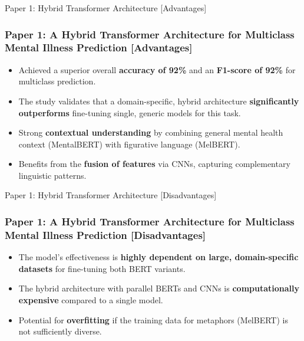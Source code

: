 \documentclass[11pt]{beamer}
\begin{document}
\begin{frame}{Paper 1: Hybrid Transformer Architecture [Advantages]}
\frametitle{Paper 1: A Hybrid Transformer Architecture for Multiclass Mental Illness Prediction [Advantages]}
\begin{itemize}
    \item Achieved a superior overall \textbf{accuracy of 92\%} and an \textbf{F1-score of 92\%} for multiclass prediction.
    \item The study validates that a domain-specific, hybrid architecture \textbf{significantly outperforms} fine-tuning single, generic models for this task.
    \item Strong \textbf{contextual understanding} by combining general mental health context (MentalBERT) with figurative language (MelBERT).
    \item Benefits from the \textbf{fusion of features} via CNNs, capturing complementary linguistic patterns.
\end{itemize}
\end{frame}

\begin{frame}{Paper 1: Hybrid Transformer Architecture [Disadvantages]}
\frametitle{Paper 1: A Hybrid Transformer Architecture for Multiclass Mental Illness Prediction [Disadvantages]}
\begin{itemize}
    \item The model's effectiveness is \textbf{highly dependent on large, domain-specific datasets} for fine-tuning both BERT variants.
    \item The hybrid architecture with parallel BERTs and CNNs is \textbf{computationally expensive} compared to a single model.
    \item Potential for \textbf{overfitting} if the training data for metaphors (MelBERT) is not sufficiently diverse.
\end{itemize}
\end{frame}
\end{document}
